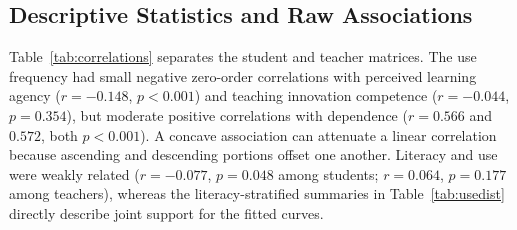 \documentclass[sustainability,article,accept,moreauthors]{Definitions/mdpi}
\begin{document}
\subsection{Descriptive Statistics and Raw Associations}\label{sec:descriptive}

Table~\ref{tab:correlations} separates the student and teacher matrices. The use frequency had small negative zero-order correlations with perceived learning agency ($r=-0.148$, $p<0.001$) and teaching innovation competence ($r=-0.044$, $p=0.354$), but moderate positive correlations with dependence ($r=0.566$ and $0.572$, both $p<0.001$). A concave association can attenuate a linear correlation because ascending and descending portions offset one another. Literacy and use were weakly related ($r=-0.077$, $p=0.048$ among students; $r=0.064$, $p=0.177$ among teachers), whereas the literacy-stratified summaries in Table~\ref{tab:usedist} directly describe joint support for the fitted curves.
\end{document}
